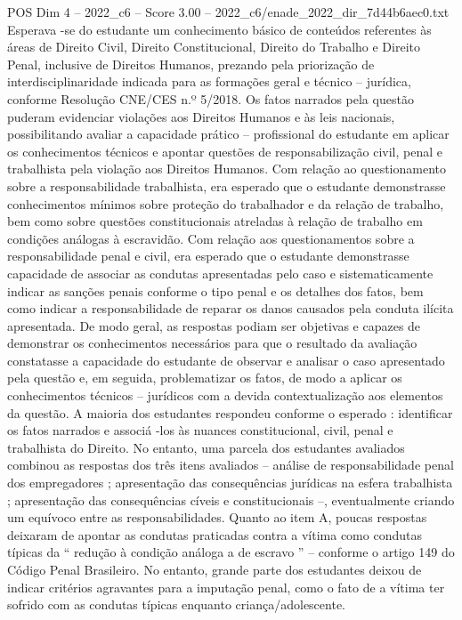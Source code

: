 \begin{textsample}{POS Dim 4 – 2022\_c6 – Score 3.00 – 2022\_c6/enade\_2022\_dir\_7d44b6aec0.txt}
Esperava -se do estudante um conhecimento básico de conteúdos referentes às áreas de Direito Civil, Direito Constitucional, Direito do Trabalho e Direito Penal, inclusive de Direitos Humanos, prezando pela priorização de interdisciplinaridade indicada para as formações geral e técnico – jurídica, conforme Resolução CNE/CES n.º 5/2018.
Os fatos narrados pela questão puderam evidenciar violações aos Direitos Humanos e às leis nacionais, possibilitando avaliar a capacidade prático – profissional do estudante em aplicar os conhecimentos técnicos e apontar questões de responsabilização civil, penal e trabalhista pela violação aos Direitos Humanos.
Com relação ao questionamento sobre a responsabilidade trabalhista, era esperado que o estudante demonstrasse conhecimentos mínimos sobre proteção do trabalhador e da relação de trabalho, bem como sobre questões constitucionais atreladas à relação de trabalho em condições análogas à escravidão.
Com relação aos questionamentos sobre a responsabilidade penal e civil, era esperado que o estudante demonstrasse capacidade de associar as condutas apresentadas pelo caso e sistematicamente indicar as sanções penais conforme o tipo penal e os detalhes dos fatos, bem como indicar a responsabilidade de reparar os danos causados pela conduta ilícita apresentada.
De modo geral, as respostas podiam ser objetivas e capazes de demonstrar os conhecimentos necessários para que o resultado da avaliação constatasse a capacidade do estudante de observar e analisar o caso apresentado pela questão e, em seguida, problematizar os fatos, de modo a aplicar os conhecimentos técnicos – jurídicos com a devida contextualização aos elementos da questão.
A maioria dos estudantes respondeu conforme o esperado : identificar os fatos narrados e associá -los às nuances constitucional, civil, penal e trabalhista do Direito.
No entanto, uma parcela dos estudantes avaliados combinou as respostas dos três itens avaliados – análise de responsabilidade penal dos empregadores ; apresentação das consequências jurídicas na esfera trabalhista ; apresentação das consequências cíveis e constitucionais –, eventualmente criando um equívoco entre as responsabilidades.
Quanto ao item A, poucas respostas deixaram de apontar as condutas praticadas contra a vítima como condutas típicas da “ redução à condição análoga a de escravo ” – conforme o artigo 149 do Código Penal Brasileiro.
No entanto, grande parte dos estudantes deixou de indicar critérios agravantes para a imputação penal, como o fato de a vítima ter sofrido com as condutas típicas enquanto criança/adolescente.

\end{textsample}
